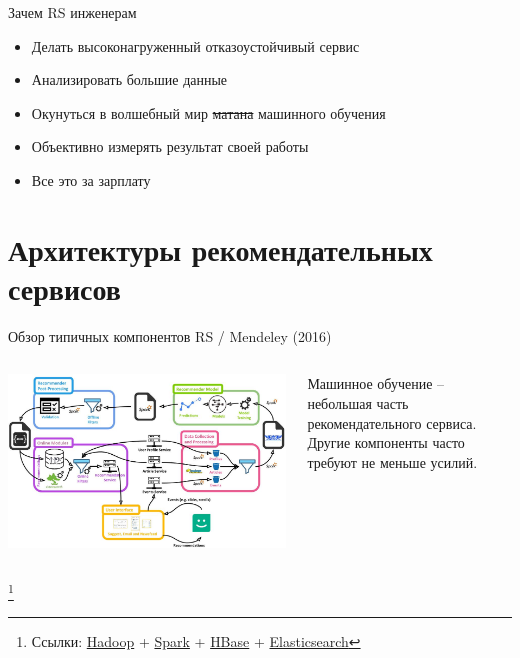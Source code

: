 \documentclass[11pt,aspectratio=169,handout]{beamer}
\begin{document}
\begin{frame}{Зачем RS инженерам}

\begin{itemize}
\item Делать высоконагруженный отказоустойчивый сервис
\item Анализировать большие данные
\item Окунуться в волшебный мир \sout{матана} машинного обучения
\item Объективно измерять результат своей работы 
\item Все это за зарплату
\end{itemize}

\end{frame}

\section{Архитектуры рекомендательных сервисов}

\begin{frame}{Обзор типичных компонентов RS / Mendeley (2016) \cite{MNDL}}
\begin{columns}
\begin{column}{0.6\textwidth}
   \begin{center}
		\includegraphics[scale=0.2]{images/mendeley.jpeg}
   \end{center}
\end{column}
\begin{column}{0.35\textwidth}
    \begin{tcolorbox}[colback=info!5,colframe=info!80,title=]
    \begin{small}
    Машинное обучение -- небольшая часть рекомендательного сервиса. Другие компоненты часто требуют не меньше усилий.
    \end{small}
    \end{tcolorbox}
\end{column}
\end{columns}

\footnote{Ссылки:
\href{https://hadoop.apache.org/}{Hadoop} +
\href{https://spark.apache.org/}{Spark} +
\href{https://hbase.apache.org/}{HBase} +
\href{https://www.elastic.co/what-is/elasticsearch}{Elasticsearch}
}

\end{frame}
\end{document}
